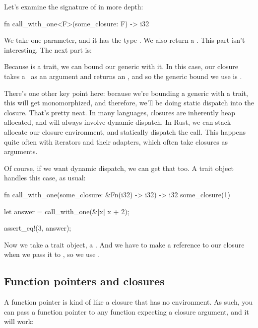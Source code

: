 \blank

Let's examine the signature of  in more depth:

\begin{rustc}
fn call_with_one<F>(some_closure: F) -> i32
\end{rustc}

We take one parameter, and it has the type . We also return a \itt. This part isn't interesting. The next part is:

\begin{rustc}
    where F : Fn(i32) -> i32 {
\end{rustc}

Because  is a trait, we can bound our generic with it. In this case, our closure takes a \itt\ as an argument and returns an 
\itt, and so the generic bound we use is .

\blank

There's one other key point here: because we're bounding a generic with a trait, this will get monomorphized, and therefore, we'll 
be doing static dispatch into the closure. That's pretty neat. In many languages, closures are inherently heap allocated, and will 
always involve dynamic dispatch. In Rust, we can stack allocate our closure environment, and statically dispatch the call. This happens 
quite often with iterators and their adapters, which often take closures as arguments.

\blank

Of course, if we want dynamic dispatch, we can get that too. A trait object handles this case, as usual:

\begin{rustc}
fn call_with_one(some_closure: &Fn(i32) -> i32) -> i32 {
    some_closure(1)
}

let answer = call_with_one(&|x| x + 2);

assert_eq!(3, answer);
\end{rustc}

Now we take a trait object, a . And we have to make a reference to our closure when we pass it to , 
so we use \code{\&||}.

\subsection*{Function pointers and closures}

A function pointer is kind of like a closure that has no environment. As such, you can pass a function pointer to any function 
expecting a closure argument, and it will work:

